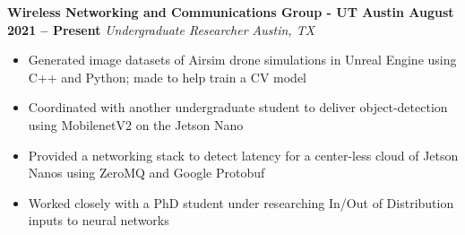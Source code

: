\documentclass[../main.tex]{subfiles}
\begin{document}
\noindent\textbf{{\fontsize{12}{14}\selectfont Wireless Networking and Communications Group - UT Austin \hfill August 2021 – Present}}\newline
\emph{Undergraduate Researcher \hfill Austin, TX}\newline
\vspace{-\topsep}
\begin{itemize}
  \setlength{\itemindent}{-6mm}
  \vspace{\listItemDist}\item Generated image datasets of Airsim drone simulations in Unreal Engine using C++ and Python; made to help train a CV model
  \vspace{\listItemDist}\item Coordinated with another undergraduate student to deliver object-detection using MobilenetV2 on the Jetson Nano
  \vspace{\listItemDist}\item Provided a networking stack to detect latency for a center-less cloud of Jetson Nanos using ZeroMQ and Google Protobuf
  \vspace{\listItemDist}\item Worked closely with a PhD student under researching In/Out of Distribution inputs to neural networks
\end{itemize}
\end{document}
